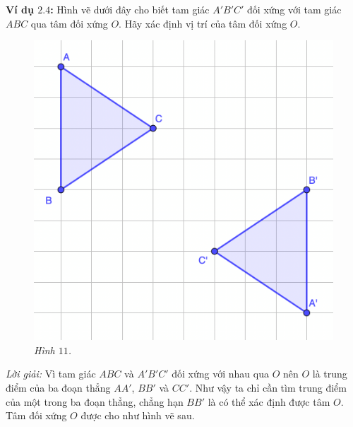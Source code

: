 \begin{multicols}{2}
\begin{figure}[H]
		\vspace*{-10pt}
	\end{figure}
	\textbf{\color{toancuabi}Ví dụ $\pmb{2.4}$:} Hình vẽ dưới đây cho biết tam giác $A'B'C'$ đối xứng với tam giác $ABC$ qua tâm đối xứng $O$. Hãy xác định vị trí của tâm đối xứng $O$. 
	\begin{figure}[H]
		\vspace*{-5pt}
		\centering
		\captionsetup{labelformat= empty, justification=centering}
		\includegraphics[width= 1\linewidth]{11}
		\caption{\small\textit{\color{toancuabi}Hình $11$.}}
		\vspace*{-10pt}
	\end{figure}
	\textit{Lời giải:} Vì tam giác $ABC$ và $A'B'C'$ đối xứng với nhau qua $O$ nên $O$ là trung điểm của ba đoạn thẳng $AA'$, $BB'$ và $CC'$. Như vậy ta chỉ cần tìm trung điểm của một trong ba đoạn thẳng, chẳng hạn $BB'$ là có thể xác định được tâm $O$. Tâm đối xứng $O$ được cho như hình vẽ sau.
	\begin{figure}[H]
		\vspace*{5pt}
		\centering
		\captionsetup{labelformat= empty, justification=centering}

\end{figure}
\end{multicols}
